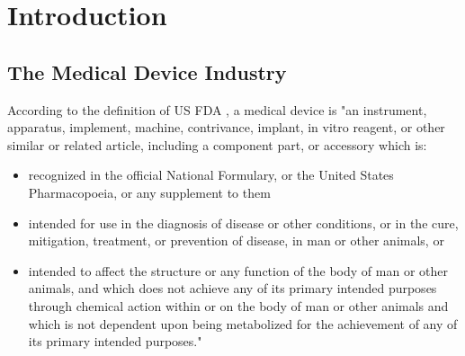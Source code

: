 \chapter{Introduction}
\section{The Medical Device Industry}
According to the definition of US FDA \cite{fda}, a medical device is "an instrument, apparatus, implement, machine, contrivance, implant, in vitro reagent, or other similar or related article, including a component part, or accessory which is:
\begin{itemize}
	\item recognized in the official National Formulary, or the United States Pharmacopoeia, or any supplement to them
	\item intended for use in the diagnosis of disease or other conditions, or in the cure, mitigation, treatment, or prevention of disease, in man or other animals, or
	\item intended to affect the structure or any function of the body of man or other animals, and which does not achieve any of its primary intended purposes through chemical action within or on the body of man or other animals and which is not dependent upon being metabolized for the achievement of any of its primary intended purposes."
\end{itemize}

